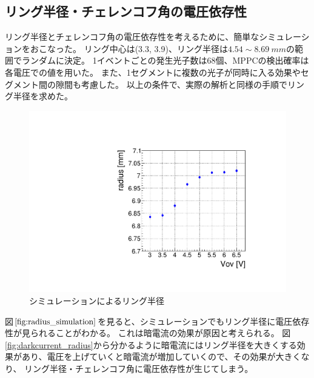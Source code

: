 \documentclass[uplatex, titlepage, dvipdfmx, 12pt, a4paper]{jsreport}
\begin{document}
    \subsection{リング半径・チェレンコフ角の電圧依存性}
    リング半径とチェレンコフ角の電圧依存性を考えるために、簡単なシミュレーションをおこなった。
    リング中心は(3.3, 3.9)、リング半径は$4.54\sim\SI{8.69}{mm}$の範囲でランダムに決定。
    1イベントごとの発生光子数は68個、MPPCの検出確率は各電圧での値を用いた。
    また、1セグメントに複数の光子が同時に入る効果やセグメント間の隙間も考慮した。
    以上の条件で、実際の解析と同様の手順でリング半径を求めた。
    \begin{figure}[h]
      \begin{center} 
        \includegraphics[scale=0.4, clip]{image/radius_simulation.pdf}
        \caption{シミュレーションによるリング半径} 
        \label{fig:radius_simulation} 
      \end{center}
    \end{figure}
    図$\ref{fig:radius_simulation}$を見ると、シミュレーションでもリング半径に電圧依存性が見られることがわかる。
    これは暗電流の効果が原因と考えられる。
    図\ref{fig:darkcurrent_radius}から分かるように暗電流にはリング半径を大きくする効果があり、電圧を上げていくと暗電流が増加していくので、その効果が大きくなり、
    リング半径・チェレンコフ角に電圧依存性が生じてしまう。
\end{document}
